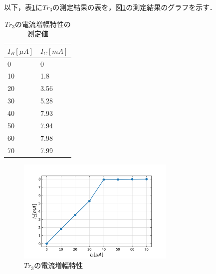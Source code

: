 \documentclass[10pt, a4j, dvipdfmx]{jarticle}
\begin{document}
    以下，表\ref{tbl:9}に$Tr_3$の測定結果の表を，図\ref{ex:9}の測定結果のグラフを示す．
    \begin{table}[H]
        \centering
        \caption{$Tr_3$の電流増幅特性の測定値}
        \label{tbl:9}
        \small
        \begin{tabular}{|l|l|}
        \hline
        $I_B[\mu A]$ & $I_C[mA]$ \\ \hline
        0            & 0         \\ \hline
        10           & 1.8       \\ \hline
        20           & 3.56      \\ \hline
        30           & 5.28      \\ \hline
        40           & 7.93      \\ \hline
        50           & 7.94      \\ \hline
        60           & 7.98      \\ \hline
        70           & 7.99      \\ \hline
        \end{tabular}
        \normalsize
    \end{table}
    \begin{figure}[H]
        \centering
        \includegraphics[height=50mm]{ex-9.png}
        \caption{$Tr_3$の電流増幅特性}
        \label{ex:9}
    \end{figure}

    \newpage
\end{document}
